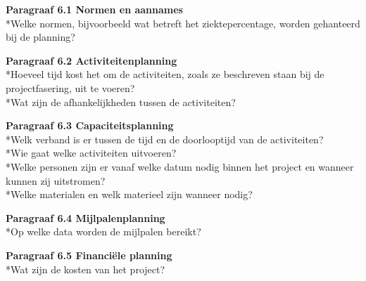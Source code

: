 \documentclass{article}
\begin{document}
\noindent
\textbf{Paragraaf 6.1 Normen en aannames}
\\*Welke normen, bijvoorbeeld wat betreft het ziektepercentage, worden gehanteerd bij de planning?
\newline

\noindent
\textbf{Paragraaf 6.2 Activiteitenplanning}
\\*Hoeveel tijd kost het om de activiteiten, zoals ze beschreven staan bij de projectfasering, uit te voeren?
\\*Wat zijn de afhankelijkheden tussen de activiteiten?
\newline

\noindent
\textbf{Paragraaf 6.3 Capaciteitsplanning}
\\*Welk verband is er tussen de tijd en de doorlooptijd van de activiteiten?
\\*Wie gaat welke activiteiten uitvoeren?
\\*Welke personen zijn er vanaf welke datum nodig binnen het project en wanneer kunnen zij uitstromen?
\\*Welke materialen en welk materieel zijn wanneer nodig?
\newline

\noindent
\textbf{Paragraaf 6.4 Mijlpalenplanning}
\\*Op welke data worden de mijlpalen bereikt?
\newline

\noindent
\textbf{Paragraaf 6.5 Financiële planning}
\\*Wat zijn de kosten van het project?
\end{document}
